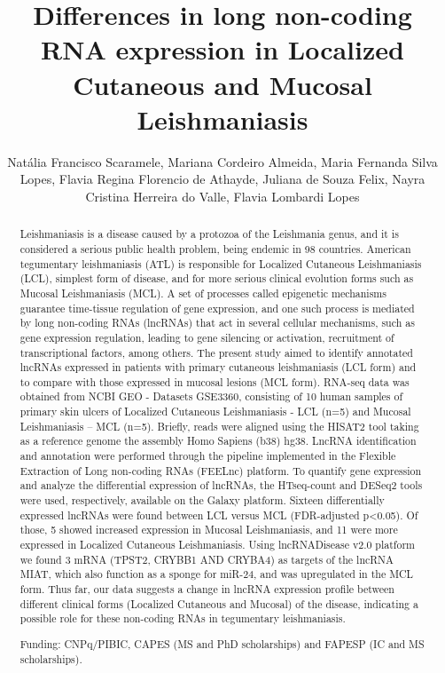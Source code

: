 \documentclass[twoside]{article}
\title{\vspace{-15mm}\fontsize{24pt}{10pt}\selectfont\textbf{ Differences in long non-coding RNA expression in Localized Cutaneous and Mucosal Leishmaniasis }} %
\author{ Nat\'alia Francisco Scaramele, Mariana Cordeiro Almeida, Maria Fernanda Silva Lopes, Flavia Regina Florencio de Athayde, Juliana de Souza Felix, Nayra Cristina Herreira do Valle, Flavia Lombardi Lopes }
\affil{ FMVA-Unesp }
\date{}
\begin{document}
  
  
  \maketitle %
  
  
  \thispagestyle{fancy} %
  
  
  \begin{abstract}
  Leishmaniasis is a disease caused by a protozoa of the Leishmania genus,  and it is considered a serious public health problem,  being endemic in 98 countries. American tegumentary leishmaniasis (ATL) is responsible for Localized Cutaneous Leishmaniasis (LCL),  simplest form of disease,  and for more serious clinical evolution forms such as Mucosal Leishmaniasis (MCL). A set of processes called epigenetic mechanisms guarantee time-tissue regulation of gene expression,  and one such process is mediated by long non-coding RNAs (lncRNAs) that act in several cellular mechanisms,  such as gene expression regulation,  leading to gene silencing or activation,  recruitment of transcriptional factors,  among others. The present study aimed to identify annotated lncRNAs expressed in patients with primary cutaneous leishmaniasis (LCL form) and to compare with those expressed in  mucosal lesions (MCL form). RNA-seq data was obtained from NCBI GEO - Datasets GSE3360,  consisting of 10 human samples of primary skin ulcers of Localized Cutaneous Leishmaniasis - LCL (n=5) and Mucosal Leishmaniasis – MCL (n=5). Briefly,  reads were aligned using the HISAT2 tool taking as a reference genome the assembly Homo Sapiens (b38) hg38. LncRNA identification and annotation were performed through the pipeline implemented in the Flexible Extraction of Long non-coding RNAs (FEELnc) platform. To quantify gene expression and analyze the differential expression of lncRNAs,  the HTseq-count and DESeq2 tools were used,  respectively,  available on the Galaxy platform. Sixteen differentially expressed lncRNAs were found between LCL versus MCL (FDR-adjusted p<0.05). Of those,  5 showed increased expression in Mucosal Leishmaniasis,  and 11 were more expressed in Localized Cutaneous Leishmaniasis. Using lncRNADisease v2.0 platform we found 3 mRNA (TPST2,  CRYBB1 AND CRYBA4) as targets of the lncRNA MIAT,  which also function as a sponge for miR-24,  and was upregulated in the MCL form. Thus far,  our data suggests a change in lncRNA expression profile between different clinical forms (Localized Cutaneous and Mucosal) of the disease,  indicating a possible role for these non-coding RNAs in tegumentary leishmaniasis.
  
  Funding: CNPq/PIBIC,  CAPES (MS and PhD scholarships) and FAPESP (IC and MS scholarships). \\ 
  \end{abstract}
  
\end{document}
